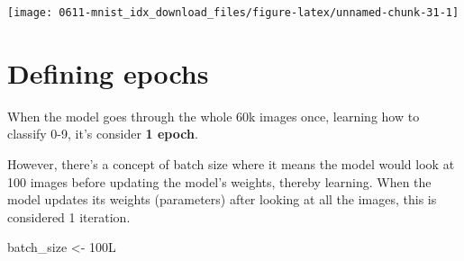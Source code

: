 \documentclass[]{book}
\newenvironment{Shaded}{\begin{snugshade}}{\end{snugshade}}
\newcommand{\CommentTok}[1]{\textcolor[rgb]{0.56,0.35,0.01}{\textit{#1}}}
\newcommand{\DataTypeTok}[1]{\textcolor[rgb]{0.13,0.29,0.53}{#1}}
\newcommand{\DecValTok}[1]{\textcolor[rgb]{0.00,0.00,0.81}{#1}}
\newcommand{\KeywordTok}[1]{\textcolor[rgb]{0.13,0.29,0.53}{\textbf{#1}}}
\newcommand{\NormalTok}[1]{#1}
\newcommand{\OperatorTok}[1]{\textcolor[rgb]{0.81,0.36,0.00}{\textbf{#1}}}
\newcommand{\StringTok}[1]{\textcolor[rgb]{0.31,0.60,0.02}{#1}}
\begin{document}
\begin{Shaded}
\end{Shaded}

\begin{center}\texttt{[image: 0611-mnist\_idx\_download\_files/figure-latex/unnamed-chunk-31-1]} \end{center}

\hypertarget{defining-epochs}{%
\section{Defining epochs}\label{defining-epochs}}

When the model goes through the whole 60k images once, learning how to classify 0-9, it's consider \textbf{1 epoch}.

However, there's a concept of batch size where it means the model would look at 100 images before updating the model's weights, thereby learning. When the model updates its weights (parameters) after looking at all the images, this is considered 1 iteration.

\begin{Shaded}
\begin{Highlighting}[]
\NormalTok{batch_size <-}\StringTok{ }\NormalTok{100L}
\end{Highlighting}
\end{Shaded}
\end{document}
